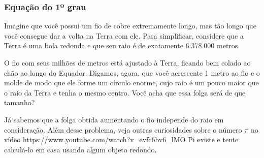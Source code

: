     \begin{frame}
    \frametitle{Equação do 1º grau} 
    
    \begin{exemplo}
    Imagine que você possui um fio de cobre extremamente longo, mas tão
    longo que você consegue dar a volta na Terra com ele. Para
    simplificar, considere que a Terra é uma bola redonda e que seu raio
    é de exatamente 6.378.000 metros.
    
    O fio com seus milhões de metros está ajustado à Terra, ficando bem
    colado ao chão ao longo do Equador. Digamos, agora, que você
    acrescente 1 metro ao fio e o molde de modo que ele forme um círculo
    enorme, cujo raio é um pouco maior que o raio da Terra e tenha o
    mesmo centro. Você acha que essa folga será de que tamanho?
    \end{exemplo}
    
    \pause Já sabemos que a folga obtida aumentando o fio independe do
    raio em consideração. Além desse problema, veja outras curiosidades
    sobre o número $\pi$ no vídeo \link
    {https://www.youtube.com/watch?v=evfc6bv6_lM}{O Pi existe} e tente
    calculá-lo em casa usando algum objeto redondo.
    
    
    \end{frame}
    
